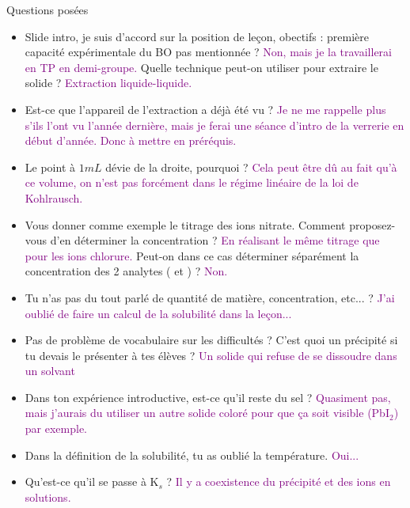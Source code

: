 \begin{reportBlock}{Questions posées}

\begin{itemize}

\item Slide intro, je suis d'accord sur la position de leçon, obectifs : première capacité expérimentale du BO pas mentionnée ? \textcolor{purple}{Non, mais je la travaillerai en TP en demi-groupe.} Quelle technique peut-on utiliser pour extraire le solide ? \textcolor{purple}{Extraction liquide-liquide.}

\item Est-ce que l'appareil de l'extraction a déjà été  vu ? \textcolor{purple}{Je ne me rappelle plus s'ils l'ont vu l'année dernière, mais je ferai une séance d'intro de la verrerie en début d'année. Donc à mettre en préréquis.}

\item Le point à $1mL$ dévie de la droite, pourquoi ? \textcolor{purple}{Cela peut être dû au fait qu'à ce volume, on n'est pas forcément dans le régime linéaire de la loi de Kohlrausch.}

\item Vous donner comme exemple le titrage des ions nitrate. Comment proposez-vous d'en déterminer la concentration ? \textcolor{purple}{En réalisant le même titrage que pour les ions chlorure.} Peut-on dans ce cas déterminer séparément la concentration des 2 analytes ( et ) ? \textcolor{purple}{Non.}

\item Tu n'as pas du tout parlé de quantité de matière, concentration, etc... ? \textcolor{purple}{J'ai oublié de faire un calcul de la solubilité dans la leçon...} 

\item Pas de problème de vocabulaire sur les difficultés ? C'est quoi un précipité si tu devais le présenter à tes élèves ? \textcolor{purple}{Un solide qui refuse de se dissoudre dans un solvant} 

\item Dans ton expérience introductive, est-ce qu'il reste du sel ? \textcolor{purple}{Quasiment pas, mais j'aurais du utiliser un autre solide coloré pour que ça soit visible (PbI$_2$) par exemple.}

\item Dans la définition de la solubilité, tu as oublié la température. \textcolor{purple}{Oui...}

\item Qu'est-ce qu'il se passe à K$_s$ ? \textcolor{purple}{Il y a coexistence du précipité et des ions en solutions.}


\end{itemize}
\end{reportBlock}
